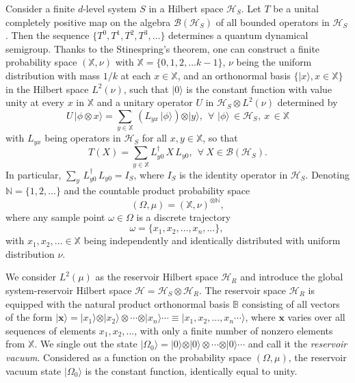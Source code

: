 Consider a finite $d$-level system $S$ in a Hilbert space $\mathcal{H}_S$. Let $T$ be a unital completely positive map on the algebra  $\mathcal{B}(\mathcal{H}_S)$ of all bounded operators in $\mathcal{H}_S$. Then the sequence $\{T^0, T^1, T^2, T^3,\ldots\}$ determines a quantum dynamical semigroup. Thanks to the Stinespring's theorem, one can construct a finite probability space  $(\mathbb{X},\nu)$ with $\mathbb{X}=\{0,1,2,\ldots k-1\}$,  $\nu$ being the uniform distribution with mass $1/k$ at each $x\in\mathbb{X}$, and an orthonormal basis $\{\vert x\rangle, x\in \mathbb{X}\}$ in the Hilbert space $L^2(\nu)$, such that  $\vert 0\rangle$ is the constant function with value unity at every $x$ in $\mathbb{X}$ and a unitary operator $U$ in $\mathcal{H}_S\otimes L^2(\nu)$ determined by 
\begin{equation}
U\, \vert \phi  \otimes  x\rangle = \sum_{y\in \mathbb{X}}\, \left( L_{yx}\,\vert \phi\rangle\right)\otimes \vert y\rangle,\ \  
\forall\,\, \vert\phi\rangle\,\in \mathcal{H}_S,\   x\, \in\mathbb{X} \label{chap8-eq2.1}
\end{equation} 
with $L_{yx}$ being operators in $\mathcal{H}_S$ for all  $x,y\in \mathbb{X}$, so that 
\begin{equation}
T(X)=\sum_{y\in \mathbb{X}} L_{y0}^\dag\, X\, L_{y0},\ \  \forall\ X\in \mathcal{B}(\mathcal{H}_S).  \label{chap8-eq2.2}
\end{equation} 
In particular, $\sum_y\, L^\dag_{y0}\, L_{y0}=I_S$, where $I_S$ is the identity operator in $\mathcal{H}_S$. 
Denoting $\mathbb{N}=\{ 1,2,\ldots\}$ and the countable product probability space 
$$
(\Omega, \mu)=(\mathbb{X}, \nu)^{\otimes \mathbb{N}},
$$
where any sample point $\omega\in \Omega$ is a discrete trajectory 
\begin{equation}
\omega=\{x_1,x_2,\ldots, x_n,\ldots\},\ \label{chap8-eq2.3} 
\end{equation} 
with  $x_1,x_2,\ldots\in\mathbb{X}$ being independently and identically distributed with uniform distribution $\nu$. 

We consider $L^2(\mu)$ as the reservoir Hilbert space $\mathcal{H}_R$ and introduce the global system-reservoir Hilbert space $\mathcal{H}=\mathcal{H}_S\otimes \mathcal{H}_R$. The reservoir space $\mathcal{H}_R$ is equipped with the natural product orthonormal basis $\mathbb{B}$ consisting of all vectors of the form $\vert\mathbf{x}\rangle=\vert x_1\rangle\otimes \vert x_2\rangle\otimes \cdots \otimes\vert x_n\rangle\cdots\equiv \vert x_1, x_2,\ldots , x_n\cdots\rangle$, where $\mathbf{x}$ varies over all sequences of elements $x_1,x_2,\ldots$, with only a finite number of nonzero elements from $\mathbb{X}$.  We single out the state $\vert\Omega_0\rangle=\vert 0\rangle\otimes \vert 0\rangle\otimes \cdots \otimes \vert 0\rangle \cdots$ and call it 
the {\it reservoir vacuum}. Considered as a function on the probability space $(\Omega, \mu)$, the reservoir vacuum state 
$\vert\Omega_0\rangle$ is the constant function, identically equal to unity. 

